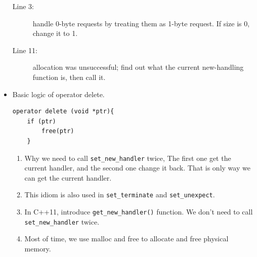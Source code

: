 \documentclass[a4paper,11pt,twoside]{book}
\begin{document}
\begin{itemize}
\begin{description}
	\item[Line 3:] handle 0-byte requests by treating them as 1-byte request. If size is 0, change it to 1.
	
	\item[Line 11:] allocation was unsuccessful; find out what the current new-handling function is, then call it.
\end{description}
\item Basic logic of operator delete.
\begin{lstlisting}[numbers=none]
operator delete (void *ptr){
	if (ptr)
		free(ptr)
	}
\end{lstlisting}

	\begin{enumerate}
		\item Why we need to call \texttt{set\_new\_handler} twice, The first one get the current handler, and the second one change it back. That is only way we can get the current handler.
		
		\item This idiom is also used in \texttt{set\_terminate} and \texttt{set\_unexpect}. 
		
		\item In C++11, introduce \texttt{get\_new\_handler()} function. We don't need to call \texttt{set\_new\_handler} twice. 
		
		\item Most of time, we use malloc and free to allocate and free physical memory.
	\end{enumerate}
\end{itemize}
\end{document}
